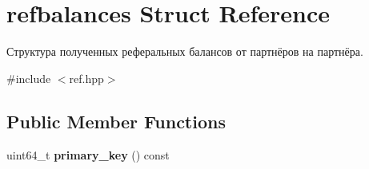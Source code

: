 \hypertarget{structrefbalances}{}\section{refbalances Struct Reference}
\label{structrefbalances}


Структура полученных реферальных балансов от партнёров на партнёра.  




{\ttfamily \#include $<$ref.\+hpp$>$}

\subsection*{Public Member Functions}
\begin{DoxyCompactItemize}
\item 
\mbox{\label{structrefbalances_aa302faf949bc790abf7f83c3d716942f}} 
uint64\+\_\+t {\bfseries primary\+\_\+key} () const
\end{DoxyCompactItemize}
